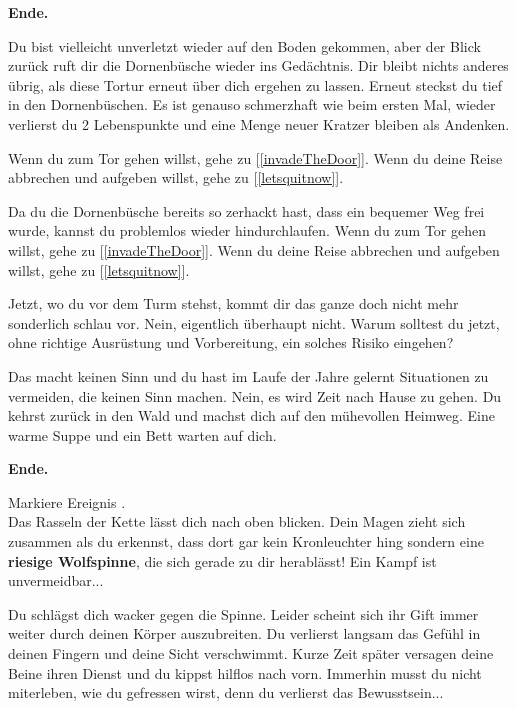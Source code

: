 \textbf{Ende.}


Du bist vielleicht unverletzt wieder auf den Boden gekommen, aber der Blick zurück ruft dir die Dornenbüsche wieder ins Gedächtnis. Dir bleibt nichts anderes übrig, als diese Tortur erneut über dich ergehen zu lassen. Erneut steckst du tief in den Dornenbüschen. Es ist genauso schmerzhaft wie beim ersten Mal, wieder verlierst du 2 Lebenspunkte und eine Menge neuer Kratzer bleiben als Andenken.

Wenn du zum Tor gehen willst, gehe zu [\ref{invadeTheDoor}].
Wenn du deine Reise abbrechen und aufgeben willst, gehe zu [\ref{letsquitnow}].


Da du die Dornenbüsche bereits so zerhackt hast, dass ein bequemer Weg frei wurde, kannst du problemlos wieder hindurchlaufen.
Wenn du zum Tor gehen willst, gehe zu [\ref{invadeTheDoor}].
Wenn du deine Reise abbrechen und aufgeben willst, gehe zu [\ref{letsquitnow}].


Jetzt, wo du vor dem Turm stehst, kommt dir das ganze doch nicht mehr sonderlich schlau vor. Nein, eigentlich überhaupt nicht. Warum solltest du jetzt, ohne richtige Ausrüstung und Vorbereitung, ein solches Risiko eingehen?

Das macht keinen Sinn und du hast im Laufe der Jahre gelernt Situationen zu vermeiden, die keinen Sinn machen. Nein, es wird Zeit nach Hause zu gehen. Du kehrst zurück in den Wald und machst dich auf den mühevollen Heimweg. Eine warme Suppe und ein Bett warten auf dich.

\textbf{Ende.}


Markiere Ereignis . \\Das Rasseln der Kette lässt dich nach oben blicken. Dein Magen zieht sich zusammen als du erkennst, dass dort gar kein Kronleuchter hing sondern eine \textbf{riesige Wolfspinne}, die sich gerade zu dir herablässt! Ein Kampf ist unvermeidbar...



Du schlägst dich wacker gegen die Spinne. Leider scheint sich ihr Gift immer weiter durch deinen Körper auszubreiten. Du verlierst langsam das Gefühl in deinen Fingern und deine Sicht verschwimmt.
Kurze Zeit später versagen deine Beine ihren Dienst und du kippst hilflos nach vorn. Immerhin musst du nicht miterleben, wie du gefressen wirst, denn du verlierst das Bewusstsein...

